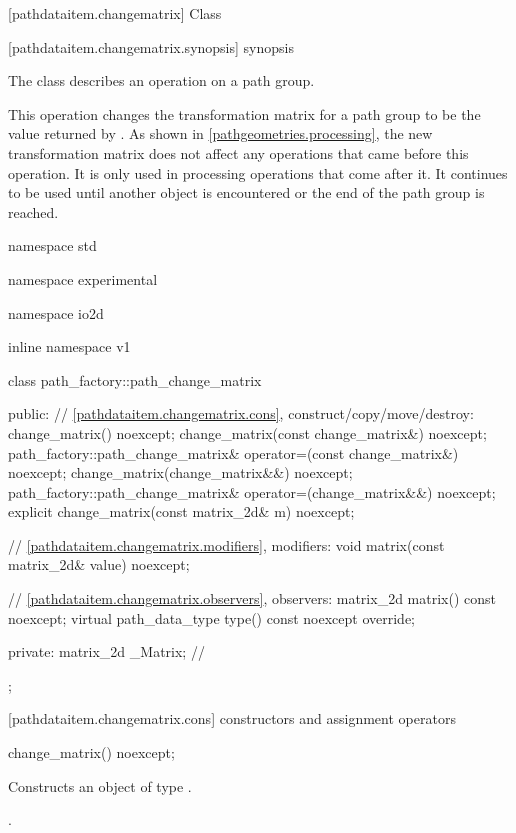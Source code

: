  [pathdataitem.changematrix] {Class }

 [pathdataitem.changematrix.synopsis] { synopsis}

\pnum
{}
The class  describes an operation on a path group.

\pnum
This operation changes the transformation matrix for a path group to be the value returned by . As shown in \ref{pathgeometries.processing}, the new transformation matrix does not affect any operations that came before this operation. It is only used in processing operations that come after it. It continues to be used until another  object is encountered or the end of the path group is reached.

\begin{codeblock}
namespace std { namespace experimental { namespace io2d { inline namespace v1 {
  class path_factory::path_change_matrix {
  public:
    // \ref{pathdataitem.changematrix.cons}, construct/copy/move/destroy:
    change_matrix() noexcept;
    change_matrix(const change_matrix&) noexcept;
    path_factory::path_change_matrix& operator=(const change_matrix&) noexcept;
    change_matrix(change_matrix&&) noexcept;
    path_factory::path_change_matrix& operator=(change_matrix&&) noexcept;
    explicit change_matrix(const matrix_2d& m) noexcept;

    // \ref{pathdataitem.changematrix.modifiers}, modifiers:
    void matrix(const matrix_2d& value) noexcept;

    // \ref{pathdataitem.changematrix.observers}, observers:
    matrix_2d matrix() const noexcept;
    virtual path_data_type type() const noexcept override;
    
  private:
    matrix_2d _Matrix; // \expos
  };
} } } }
\end{codeblock}

 [pathdataitem.changematrix.cons] { constructors and assignment operators}

\begin{itemdecl}
    change_matrix() noexcept;
\end{itemdecl}
\begin{itemdescr}
	\pnum
	\effects
	Constructs an object of type .
	
	\pnum
	\postconditions
	.
\end{itemdescr}

